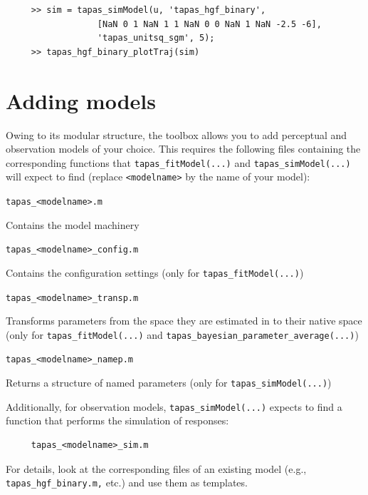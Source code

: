 \documentclass[11pt,a4paper]{article}
\numberwithin{equation}{section}
\begin{document}
\begin{verbatim}
     >> sim = tapas_simModel(u, 'tapas_hgf_binary',
                  [NaN 0 1 NaN 1 1 NaN 0 0 NaN 1 NaN -2.5 -6],
                  'tapas_unitsq_sgm', 5);
     >> tapas_hgf_binary_plotTraj(sim)
\end{verbatim}

\section{Adding models}
\label{sec:addmod}

Owing to its modular structure, the toolbox allows you to add
perceptual and observation models of your choice. This requires the
following files containing the corresponding functions that
\texttt{tapas\_fitModel(...)} and \texttt{tapas\_simModel(...)}  will
expect to find (replace \texttt{<modelname>} by the name of your
model):

\begin{description}
\item{\texttt{tapas\_<modelname>.m}}

  Contains the model machinery

\item{\texttt{tapas\_<modelname>\_config.m}}

  Contains the configuration settings (only for
  \texttt{tapas\_fitModel(...)})

\item{\texttt{tapas\_<modelname>\_transp.m}}

    Transforms parameters from the space they are estimated in to
    their native space (only for \texttt{tapas\_fitModel(...)} and
    \texttt{tapas\_bayesian\_parameter\_average(...)})

\item{\texttt{tapas\_<modelname>\_namep.m}}

  Returns a structure of named parameters (only for
  \texttt{tapas\_simModel(...)})
\end{description}

Additionally, for observation models, \texttt{tapas\_simModel(...)}
expects to find a function that performs the simulation of responses:

\begin{verbatim}
     tapas_<modelname>_sim.m
\end{verbatim}

For details, look at the corresponding files of an existing model
(e.g., \texttt{tapas\_hgf\_binary.m,} etc.) and use them as templates.
\end{document}
